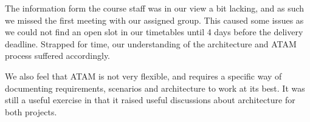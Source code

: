 The information form the course staff was in our view a bit lacking, and as such
we missed the first meeting with our assigned group.  This caused some issues
as we could not find an open slot in our timetables until 4 days before the
delivery deadline.  Strapped for time, our understanding of the architecture
and ATAM process suffered accordingly.

We also feel that ATAM is not very flexible, and requires a specific
way of documenting requirements, scenarios and architecture to work at
its best. It was still a useful exercise in that it raised useful discussions
about architecture for both projects.

